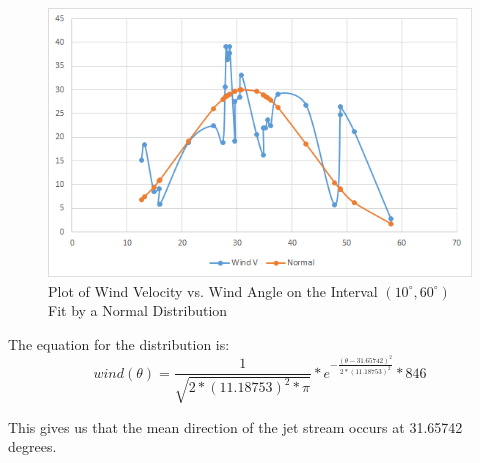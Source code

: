 \documentclass{journal}
\begin{document}
\begin{figure}[H]
  \centering
  \includegraphics[width=\textwidth]{alan-data-2.png}
  \caption{Plot of Wind Velocity vs. Wind Angle on the Interval $(10^{\circ}, 60^{\circ})$ Fit by a Normal Distribution}
\end{figure}

The equation for the distribution is:
\[
wind(\theta) = \frac{1}{\sqrt{2*(11.18753)^2*\pi}}*e^{-\frac{(\theta-31.65742)^2}{2*(11.18753)^2}}*846
\]

This gives us that the mean direction of the jet stream occurs at 31.65742 degrees.
\end{document}
